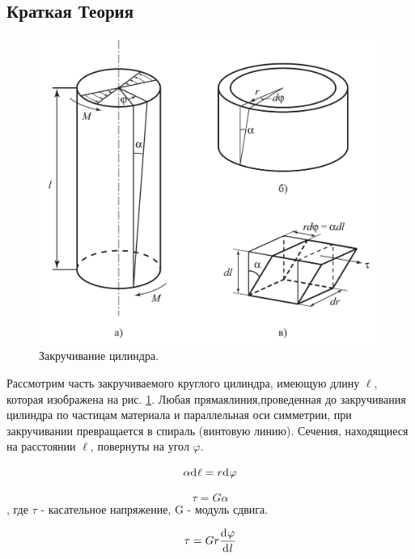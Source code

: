 \documentclass[a4paper,12pt]{article}
\begin{document}
\subsection{Краткая Теория}

\begin{figure} [h] \center
  \includegraphics[scale = 0.5]{131-132/2 pic 1.png}
  \caption{Закручивание цилиндра. \label{pic:3}}
\end{figure}

Рассмотрим часть закручиваемого круглого цилиндра, имеющую длину $\ell$, которая изображена на рис. \ref{pic:3}. Любая прямаялиния,проведенная до закручивания цилиндра по частицам материала и параллельная оси симметрии, при закручивании превращается в спираль (винтовую линию). Сечения, находящиеся на расстоянии $\ell$, повернуты на угол $\varphi$.



\begin{equation}
  \alpha \d{\ell} = r \d{\varphi} {\label{eq:2.1}}
\end{equation}

\begin{equation}
  \tau = G \alpha \label{eq:2.2}
\end{equation}
, где $\tau$ - касательное напряжение, G - модуль сдвига.

\begin{equation}
  \tau = G r \deriv{\varphi}{l} \label{eq:2.3}
\end{equation}
\end{document}
